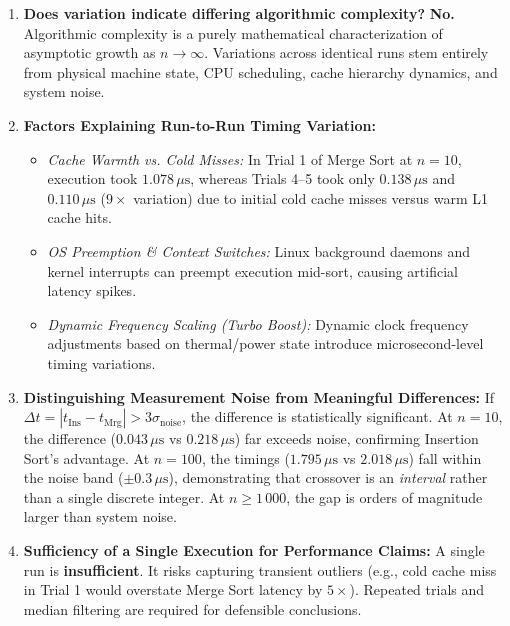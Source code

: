 \documentclass[11pt]{article}
\begin{document}
\begin{enumerate}[itemsep=0.08em, topsep=0.1em]
    \item \textbf{Does variation indicate differing algorithmic complexity?}
    \textbf{No.} Algorithmic complexity is a purely mathematical characterization of asymptotic growth as $n \to \infty$. Variations across identical runs stem entirely from physical machine state, CPU scheduling, cache hierarchy dynamics, and system noise.

    \item \textbf{Factors Explaining Run-to-Run Timing Variation:}
    \begin{itemize}[itemsep=0.02em, topsep=0.05em]
        \item \textit{Cache Warmth vs. Cold Misses:} In Trial 1 of Merge Sort at $n = 10$, execution took $1.078\,\mu\text{s}$, whereas Trials 4--5 took only $0.138\,\mu\text{s}$ and $0.110\,\mu\text{s}$ ($9\times$ variation) due to initial cold cache misses versus warm L1 cache hits.
        \item \textit{OS Preemption \& Context Switches:} Linux background daemons and kernel interrupts can preempt execution mid-sort, causing artificial latency spikes.
        \item \textit{Dynamic Frequency Scaling (Turbo Boost):} Dynamic clock frequency adjustments based on thermal/power state introduce microsecond-level timing variations.
    \end{itemize}

    \item \textbf{Distinguishing Measurement Noise from Meaningful Differences:}
    If $\Delta t = |t_{\text{Ins}} - t_{\text{Mrg}}| > 3\sigma_{\text{noise}}$, the difference is statistically significant. At $n = 10$, the difference ($0.043\,\mu\text{s}$ vs $0.218\,\mu\text{s}$) far exceeds noise, confirming Insertion Sort's advantage. At $n = 100$, the timings ($1.795\,\mu\text{s}$ vs $2.018\,\mu\text{s}$) fall within the noise band ($\pm 0.3\,\mu\text{s}$), demonstrating that crossover is an \textit{interval} rather than a single discrete integer. At $n \ge 1\,000$, the gap is orders of magnitude larger than system noise.

    \item \textbf{Sufficiency of a Single Execution for Performance Claims:}
    A single run is \textbf{insufficient}. It risks capturing transient outliers (e.g., cold cache miss in Trial 1 would overstate Merge Sort latency by $5\times$). Repeated trials and median filtering are required for defensible conclusions.


\end{enumerate}
\end{document}
